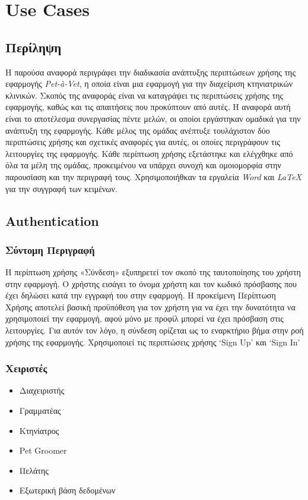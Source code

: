 \documentclass[12pt,a4paper,twoside]{book}
\renewcommand{\headrulewidth}{0pt} %
\renewcommand{\headrulewidth}{0pt}
\let\oldtableofcontents\tableofcontents
\renewcommand{\tableofcontents}{%
    \clearpage
    \thispagestyle{empty}
    \pagestyle{tocstyle}
    \oldtableofcontents %
    \clearpage
    \pagestyle{fancy}
    \fancyhead[LE]{\thepage} %
    \fancyhead[CE]{\leftmark} %
    \fancyhead[RE]{ΚΕΦ. \thechapter} %

    \fancyhead[LO]{\thesection} %
    \fancyhead[CO]{\rightmark} %
    \fancyhead[RO]{\thepage} %

    \renewcommand{\headrulewidth}{0.4pt} %

    \renewcommand{\chaptermark}[1]{\markboth{##1}{}}
    \renewcommand{\sectionmark}[1]{\markright{##1}}
}
\begin{document}
\tableofcontents

\printindex

\chapter{Use Cases}

\section{Περίληψη}

Η παρούσα αναφορά περιγράφει την διαδικασία ανάπτυξης περιπτώσεων χρήσης της εφαρμογής \textit{Pet-à-Vet}, η οποία είναι μια εφαρμογή για την διαχείριση κτηνιατρικών κλινικών. Σκοπός της αναφοράς είναι να καταγράψει τις περιπτώσεις χρήσης της εφαρμογής, καθώς και τις απαιτήσεις που προκύπτουν από αυτές. Η αναφορά αυτή είναι το αποτέλεσμα συνεργασίας πέντε μελών, οι οποίοι εργάστηκαν ομαδικά για την ανάπτυξη της εφαρμογής. Κάθε μέλος της ομάδας ανέπτυξε τουλάχιστον δύο περιπτώσεις χρήσης και σχετικές αναφορές για αυτές, οι οποίες περιγράφουν τις λειτουργίες της εφαρμογής. Κάθε περίπτωση χρήσης εξετάστηκε και ελέγχθηκε από όλα τα μέλη της ομάδας, προκειμένου να υπάρχει συνοχή και ομοιομορφία στην παρουσίαση και την περιγραφή τους. Χρησιμοποιήθκαν τα εργαλεία \textit{Word} και \textit{LaTeX} για την συγγραφή των κειμένων. %

\section{Authentication}

\subsection{Σύντομη Περιγραφή}
Η περίπτωση χρήσης «Σύνδεση» εξυπηρετεί τον σκοπό της ταυτοποίησης του χρήστη στην εφαρμογή. Ο χρήστης εισάγει το όνομα χρήστη και τον κωδικό πρόσβασης που έχει δηλώσει κατά την εγγραφή του στην εφαρμογή. Η προκείμενη Περίπτωση Χρήσης αποτελεί βασική προϋπόθεση για τον χρήστη για να έχει την δυνατότητα να χρησιμοποιεί την εφαρμογή, αφού μόνο με προφίλ μπορεί να έχει πρόσβαση στις λειτουργίες. Για αυτόν τον λόγο, η σύνδεση ορίζεται ως το εναρκτήριο βήμα στην ροή χρήσης της εφαρμογής. Χρησιμοποιεί τις περιπτώσεις χρήσης `Sign Up' και `Sign In' %

\subsection{Χειριστές}
\begin{itemize}
  \item Διαχειριστής
  \item Γραμματέας
  \item Κτηνίατρος
  \item Pet Groomer
  \item Πελάτης
  \item Εξωτερική βάση δεδομένων %
\end{itemize}
\end{document}
